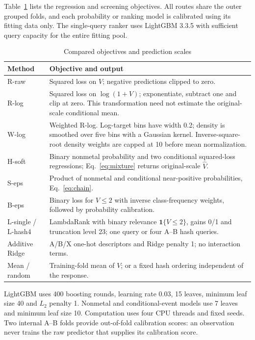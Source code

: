 Table~\ref{tab:routes} lists the regression and screening objectives. All routes share the outer grouped folds, and each probability or ranking model is calibrated using its fitting data only. The single-query ranker uses LightGBM 3.3.5 with sufficient query capacity for the entire fitting pool.
\par
\begin{table}[H]
\centering
\caption{Compared objectives and prediction scales}\label{tab:routes}
\begin{tabularx}{\linewidth}{@{}l X@{}}
\toprule
Method & Objective and output\\
\midrule
R-raw & Squared loss on $V$; negative predictions clipped to zero.\\
R-log & Squared loss on $\log(1+V)$; exponentiate, subtract one and clip at zero. This transformation need not estimate the original-scale conditional mean.\\
W-log & Weighted R-log. Log-target bins have width 0.2; density is smoothed over five bins with a Gaussian kernel. Inverse-square-root density weights are capped at 10 before mean normalization.\\
H-soft & Binary nonmetal probability and two conditional squared-loss regressions; Eq.~\eqref{eq:mixture} returns original-scale $\widehat V$.\\
S-eps & Product of nonmetal and conditional near-positive probabilities, Eq.~\eqref{eq:chain}.\\
B-eps & Binary loss for $V\le2$ with inverse class-frequency weights, followed by probability calibration.\\
L-single / L-hash4 & LambdaRank with binary relevance $\mathbf{1}\{V\le2\}$, gains 0/1 and truncation level 23; one query or four A--B hash queries.\\
Additive Ridge & A/B/X one-hot descriptors and Ridge penalty 1; no interaction terms.\\
Mean / random & Training-fold mean of $V$; or a fixed hash ordering independent of the response.\\
\bottomrule
\end{tabularx}
\end{table}
\par
LightGBM uses 400 boosting rounds, learning rate 0.03, 15 leaves, minimum leaf size 40 and $L_2$ penalty 1. Nonmetal and conditional-event models use 7 leaves and minimum leaf size 10. Computation uses four CPU threads and fixed seeds. Two internal A--B folds provide out-of-fold calibration scores: an observation never trains the raw predictor that supplies its calibration score.

